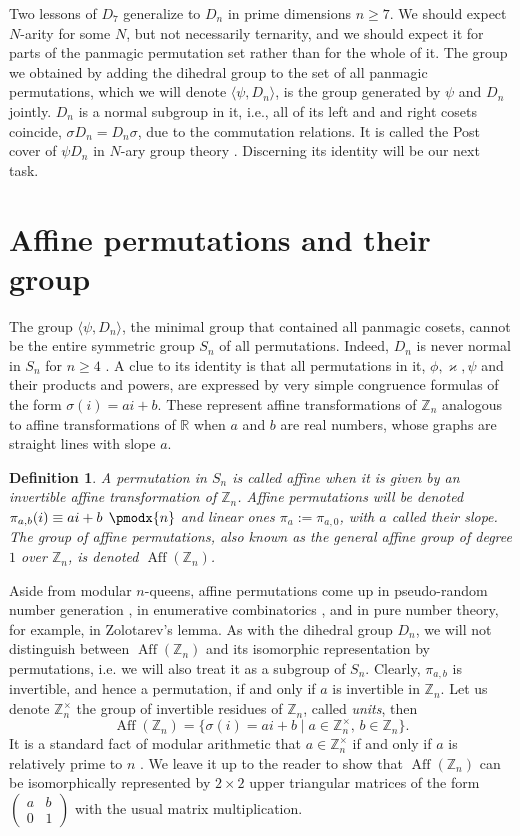 \documentclass[11pt]{article}
\makeatletter
\renewcommand{\pmod}{%
  \allowbreak
  \if@display\mkern18mu\else\mkern8mu\fi
  \pmodx
}
\theoremstyle{plain}
\newtheorem{definition}{Definition}
\theoremstyle{definition}
\newcommand{\+}[1]{{#1}^\times}
\def\Aff{\operatorname{Aff}}
\def\R{{\mathbb R}}
\def\Z{{\mathbb Z}}
\def\s{{\sigma}}
\def\k{{\varkappa}}
\makeatother
\begin{document}
Two lessons of $D_7$ generalize to $D_n$ in prime dimensions $n\geq7$. We should expect $N$-arity for some $N$, but not necessarily ternarity, and we should expect it for parts of the panmagic permutation set rather than for the whole of it. The group we obtained by adding the dihedral group to the set of all panmagic permutations, which we will denote $\langle\psi,D_n\rangle$, is the group generated by $\psi$ and $D_n$ jointly. $D_n$ is a normal subgroup in it, i.e., all of its left and and right cosets coincide, $\s D_n=D_n \s$, due to the commutation relations. It is called the Post cover of $\psi D_n$ in $N$-ary group theory \cite{GBV,Shah}. Discerning its identity will be our next task.

\section{Affine permutations and their group}\label{Affine}


The group $\langle\psi,D_n\rangle$, the minimal group that contained all panmagic cosets, cannot be the entire symmetric group $S_n$ of all permutations. Indeed, $D_n$ is never normal in $S_n$ for $n\geq4$ \cite{Gallian}. A clue to its identity is that all permutations in it, $\phi,\k,\psi$ and their products and powers, are expressed by very simple congruence formulas of the form $\s(i)=ai+b$. These represent affine transformations of $\Z_n$ analogous to affine transformations of $\R$ when $a$ and $b$ are real numbers, whose graphs are straight lines with slope $a$.
\begin{definition}\label{pia} A permutation in $S_n$ is called affine when it is given by an invertible affine transformation of $\Z_n$. Affine permutations will be denoted $\pi_{a,b}(i)\equiv ai+b\pmod{n}$ and linear ones $\pi_a:=\pi_{a,0}$, with $a$ called their slope. The group of affine permutations, also known as the general affine group of degree $1$ over $\Z_n$, is denoted $\Aff(\Z_n)$. 
\end{definition}
\noindent Aside from modular $n$-queens, affine permutations come up in pseudo-random number generation \cite{HD,Mars}, in enumerative combinatorics \cite{BK-V}, and in pure number theory, for example, in Zolotarev's lemma. As with the dihedral group $D_n$, we will not distinguish between $\Aff(\Z_n)$ and its isomorphic representation by permutations, i.e. we will also treat it as a subgroup of $S_n$. Clearly, $\pi_{a,b}$ is invertible, and hence a permutation, if and only if $a$ is invertible in $\Z_n$. Let us denote $\+{\Z}_n$ the group of invertible residues of $\Z_n$, called {\it units}, then
\begin{equation}\label{GAmod}
\Aff(\Z_n)=\{\s(i)=ai+b\mid a\in\+{\Z}_n,\,b\in\Z_n\}.
\end{equation}
It is a standard fact of modular arithmetic that $a\in\+{\Z}_n$ if and only if $a$ is relatively prime to $n$ \cite{Rosen}. We leave it up to the reader to show that $\Aff(\Z_n)$ can be isomorphically represented by $2\times2$ upper triangular matrices of the form $\begin{pmatrix}
a  &  b\\
0  &  1\end{pmatrix}$ with the usual matrix multiplication. 
\end{document}
